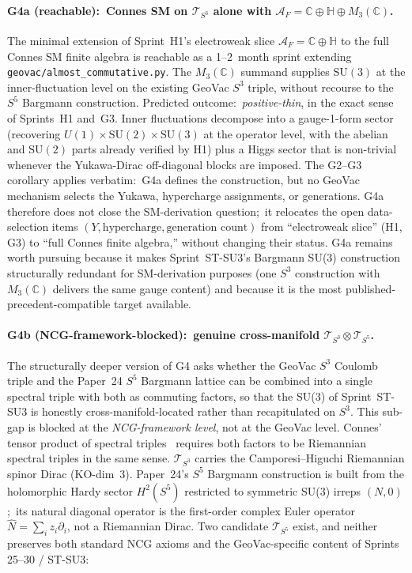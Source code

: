 \documentclass[11pt]{article}
\begin{document}
\paragraph{G4a (reachable):\ Connes SM on $\mathcal{T}_{S^3}$ alone
with $\mathcal{A}_F = \mathbb{C} \oplus \mathbb{H} \oplus
M_3(\mathbb{C})$.}  The minimal extension of Sprint~H1's electroweak
slice $\mathcal{A}_F = \mathbb{C} \oplus \mathbb{H}$ to the full
Connes SM finite algebra is reachable as a 1--2~month sprint
extending \texttt{geovac/almost\_commutative.py}.  The
$M_3(\mathbb{C})$ summand supplies $\mathrm{SU}(3)$ at the
inner-fluctuation level on the existing GeoVac $S^3$ triple, without
recourse to the $S^5$ Bargmann construction.  Predicted
outcome:\ \emph{positive-thin}, in the exact sense of Sprints~H1
and~G3.  Inner fluctuations decompose into a gauge-1-form sector
(recovering $U(1) \times \mathrm{SU}(2) \times \mathrm{SU}(3)$ at the
operator level, with the abelian and $\mathrm{SU}(2)$ parts already
verified by H1) plus a Higgs sector that is non-trivial whenever the
Yukawa-Dirac off-diagonal blocks are imposed.  The G2--G3 corollary
applies verbatim:\ G4a defines the construction, but no GeoVac
mechanism selects the Yukawa, hypercharge assignments, or
generations.  G4a therefore does not close the SM-derivation
question;\ it relocates the open data-selection items
$(Y, \text{hypercharge}, \text{generation count})$ from
``electroweak slice'' (H1, G3) to ``full Connes finite algebra,''
without changing their status.  G4a remains worth pursuing because
it makes Sprint~ST-SU3's Bargmann SU(3) construction structurally
redundant for SM-derivation purposes (one $S^3$ construction with
$M_3(\mathbb{C})$ delivers the same gauge content) and because it
is the most published-precedent-compatible target available.

\paragraph{G4b (NCG-framework-blocked):\ genuine cross-manifold
$\mathcal{T}_{S^3} \otimes \mathcal{T}_{S^5}$.}  The structurally
deeper version of G4 asks whether the GeoVac $S^3$ Coulomb triple
and the Paper~24 $S^5$ Bargmann lattice can be combined into a
single spectral triple with both as commuting factors, so that the
SU(3) of Sprint~ST-SU3 is honestly cross-manifold-located rather
than recapitulated on $S^3$.  This sub-gap is blocked at the
\emph{NCG-framework level}, not at the GeoVac level.  Connes' tensor
product of spectral triples~\cite{connes_marcolli2008} requires
both factors to be Riemannian spectral triples in the same sense.
$\mathcal{T}_{S^3}$ carries the Camporesi--Higuchi Riemannian spinor
Dirac (KO-dim~3).  Paper~24's $S^5$ Bargmann construction is built
from the holomorphic Hardy sector $H^2(S^5)$ restricted to symmetric
SU(3) irreps $(N, 0)$;\ its natural diagonal operator is the
first-order complex Euler operator
$\hat{N} = \sum_i z_i \partial_i$, not a Riemannian Dirac.  Two
candidate $\mathcal{T}_{S^5}$ exist, and neither preserves both
standard NCG axioms and the GeoVac-specific content of Sprints
25--30 / ST-SU3:
\end{document}

